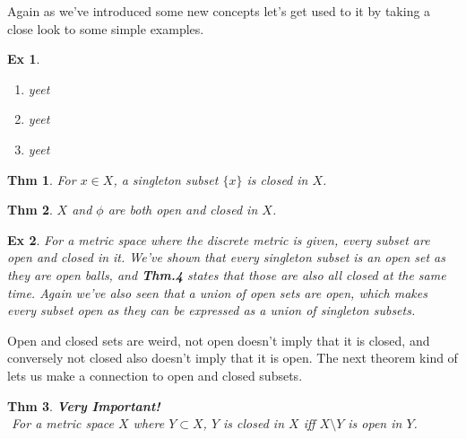 \documentclass[paper=a4, fontsize=11pt]{scrartcl}
\newtheorem{theorem}{Thm}
\newtheorem{example}{Ex}
\begin{document}
Again as we've introduced some new concepts let's get used to it by taking a close look to some simple examples.\\
\begin{example}
$ $ \newline
\vspace{-0.15in}
\begin{enumerate}[label=\arabic*)]
	\item yeet
	\item yeet
	\item yeet\\
\end{enumerate}
\end{example}

\begin{theorem}
	For $x \in X$, a singleton subset $\{x\}$ is closed in $X$.\\
\end{theorem}

\begin{theorem}
	 $X$ and $\phi$ are both open and closed in $X$.\\
\end{theorem}

\begin{example}
	For a metric space where the discrete metric is given, every subset are open and closed in it. We've shown that every singleton subset is an open set as they are open balls, and \textbf{Thm.4} states that those are also all closed at the same time. Again we've also seen that a union of open sets are open, which makes every subset open as they can be expressed as a union of singleton subsets. \\
\end{example}

Open and closed sets are weird, not open doesn't imply that it is closed, and conversely not closed also doesn't imply that it is open. The next theorem kind of lets us make a connection to open and closed subsets.\\

\begin{theorem}
\textbf{Very Important!} \\
$ $ \newline 
 For a metric space $X$ where $Y \subset X$, $Y$ is closed in $X$ iff $X\setminus Y$ is open in $Y$.\\
\end{theorem}
\end{document}
